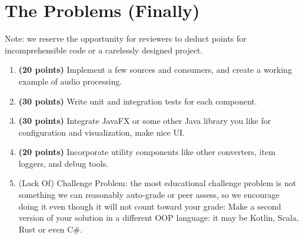 \documentclass[a4paper,12pt]{article}
\begin{document}
\section{The Problems (Finally)}
Note: we reserve the opportunity for reviewers to deduct points
for incomprehensible code or a carelessly designed project.
\begin{enumerate}
  \item \textbf{(20 points)} Implement a few sources and consumers,
  and create a working example of audio processing.

  \item \textbf{(30 points)} Write unit and integration tests for each component.

  \item \textbf{(30 points)} Integrate JavaFX or some other Java library you like
  for configuration and visualization, make nice UI.

  \item \textbf{(20 points)} Incorporate utility components like other converters,
  item loggers, and debug tools.

  \item (Lack Of) Challenge Problem:
  the most educational challenge problem is not something
  we can reasonably auto-grade or peer assess, so we encourage doing it even
  though it will not count toward your grade:
  Make a second version of your solution in a different OOP language:
  it may be Kotlin, Scala, Rust or even C#.
\end{enumerate}
\end{document}
